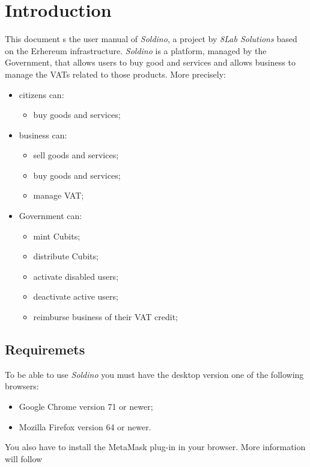 \section{Introduction} 
	This document s the user manual of \textit{Soldino}, a project by 
	\textit{8Lab Solutions} based on the Erhereum infrastructure. 
	\textit{Soldino} is a platform, managed by the Government, that allows 
	users to buy good and services and allows business to manage the VATs 
	related to those products.
	More precisely:
	\begin{itemize}
		\item citizens can:
		\begin{itemize}
			\item  buy goods and services;
		\end{itemize}
		\item business can:
		\begin{itemize}
			\item sell goods and services;
			\item buy goods and services;
			\item manage VAT;
		\end{itemize}
		\item Government can:
		\begin{itemize}
			\item mint Cubits;
			\item distribute Cubits;
			\item activate disabled users;
			\item deactivate active users;
			\item reimburse business of their VAT credit;
		\end{itemize}
	\end{itemize}

\subsection{Requiremets}
	To be able to use \textit{Soldino} you must have the desktop version one 
	of the following browsers:
	\begin{itemize}
		\item Google Chrome version 71 or newer;
		\item Mozilla Firefox version 64 or newer.
	\end{itemize}
	You also have to install the MetaMask plug-in in your browser. More information 
	will follow 